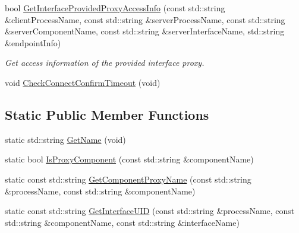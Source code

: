 \begin{DoxyCompactItemize}
\item 
bool \hyperlink{classmts_manager_global_ac56f876d73d6c494aa715d1081c9b720}{Get\-Interface\-Provided\-Proxy\-Access\-Info} (const std\-::string \&client\-Process\-Name, const std\-::string \&server\-Process\-Name, const std\-::string \&server\-Component\-Name, const std\-::string \&server\-Interface\-Name, std\-::string \&endpoint\-Info)
\begin{DoxyCompactList}\small\item\em Get access information of the provided interface proxy. \end{DoxyCompactList}\item 
void \hyperlink{classmts_manager_global_a9835ba6dae5a052c997cf5efedd10adc}{Check\-Connect\-Confirm\-Timeout} (void)
\end{DoxyCompactItemize}
\subsection*{Static Public Member Functions}
\begin{DoxyCompactItemize}
\item 
static std\-::string \hyperlink{classmts_manager_global_acd6653c4d0c6e49d7cbc890293d596e5}{Get\-Name} (void)
\item 
static bool \hyperlink{classmts_manager_global_a06739ca78771998b588fa3c3e686edff}{Is\-Proxy\-Component} (const std\-::string \&component\-Name)
\item 
static const std\-::string \hyperlink{classmts_manager_global_acfd4a5bfc428a23c5f0b1ae60bc3b39d}{Get\-Component\-Proxy\-Name} (const std\-::string \&process\-Name, const std\-::string \&component\-Name)
\item 
static const std\-::string \hyperlink{classmts_manager_global_ac5416bee759e773bb7d4bd9670db8291}{Get\-Interface\-U\-I\-D} (const std\-::string \&process\-Name, const std\-::string \&component\-Name, const std\-::string \&interface\-Name)
\end{DoxyCompactItemize}
